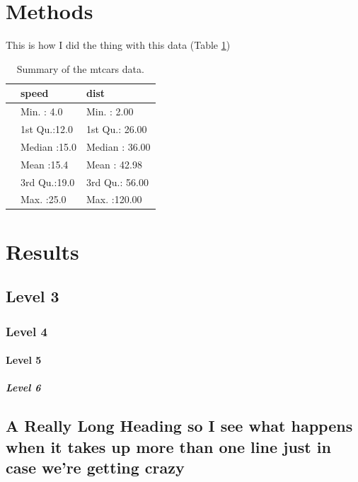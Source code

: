 \documentclass[
  10pt,
]{report}
\begin{document}
\hypertarget{methods}{%
\section{Methods}\label{methods}}

This is how I did the thing with this data (Table \ref{tab:testtable})

\begin{table}

\caption{\label{tab:testtable}Summary of the mtcars data.}
\centering
\begin{tabular}[t]{lll}
\toprule
  &     speed &      dist\\
\midrule
 & Min.   : 4.0 & Min.   :  2.00\\
 & 1st Qu.:12.0 & 1st Qu.: 26.00\\
 & Median :15.0 & Median : 36.00\\
 & Mean   :15.4 & Mean   : 42.98\\
 & 3rd Qu.:19.0 & 3rd Qu.: 56.00\\
\addlinespace
 & Max.   :25.0 & Max.   :120.00\\
\bottomrule
\end{tabular}
\end{table}

\hypertarget{results}{%
\section{Results}\label{results}}

\hypertarget{level-3}{%
\subsection{Level 3}\label{level-3}}

\hypertarget{level-4}{%
\subsubsection{Level 4}\label{level-4}}

\hypertarget{level-5}{%
\paragraph{Level 5}\label{level-5}}

\hypertarget{level-6}{%
\subparagraph{Level 6}\label{level-6}}

\hypertarget{a-really-long-heading-so-i-see-what-happens-when-it-takes-up-more-than-one-line-just-in-case-were-getting-crazy-1}{%
\subsection{A Really Long Heading so I see what happens when it takes up more than one line just in case we're getting crazy}\label{a-really-long-heading-so-i-see-what-happens-when-it-takes-up-more-than-one-line-just-in-case-were-getting-crazy-1}}
\end{document}
